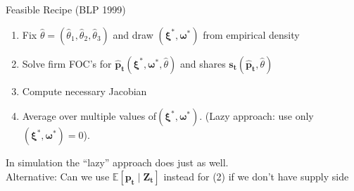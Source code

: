 


\begin{frame}{Feasible Recipe (BLP 1999)}
\begin{enumerate}
\item Fix $\widehat{\theta}=(\widehat{\theta}_1,\widehat{\theta}_2,\widehat{\theta}_3)$ and draw $(\symbf{\xi}^{*},\symbf{\omega}^{*})$ from empirical density
\item Solve firm FOC's for $\symbf{\hat{p}_{t}}(\symbf{\xi}^{*},\symbf{\omega}^{*},\widehat{\theta})$ and shares $\symbf{s_{t}}(\symbf{\hat{p}_{t}},\widehat{\theta})$
\item Compute necessary Jacobian
\item Average over multiple values of$(\symbf{\xi}^{*},\symbf{\omega}^{*})$. (Lazy approach: use only $(\symbf{\xi}^{*},\symbf{\omega}^{*})=0$).
\end{enumerate}
In simulation the ``lazy'' approach does just as well.\\

 Alternative: Can we use $\mathbb{E}[ \symbf{p_t} \mid \symbf{Z_t}]$ instead for (2) if we don't have supply side
\end{frame}




